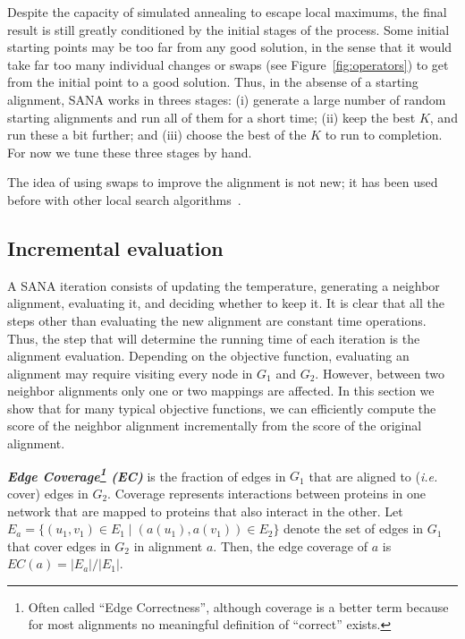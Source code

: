 \documentclass{bioinfo}
\begin{document}
\begin{methods}
Despite the capacity of simulated annealing to escape local maximums, the final result is still greatly conditioned by the initial stages of the process. Some initial starting points may be too far from any good solution, in the sense that it would take far too many individual changes or swaps (see Figure~\ref{fig:operators}) to get from the initial point to a good solution.
Thus, in the absense of a starting alignment, SANA works in threes stages: (i) generate a large number of random starting alignments and run all of them for a short time; (ii) keep the best $K$, and run these a bit further; and (iii) choose the best of the $K$ to run to completion.  For now we tune these three stages by hand.

The idea of using swaps to improve the alignment is not new; it has been used before with other local search algorithms~\citep{MAGNA,PISwap}.

\subsection{Incremental evaluation}\label{implementation}

A SANA iteration consists of updating the temperature, generating a neighbor alignment, evaluating it, and deciding whether to keep it. It is clear that all the steps other than evaluating the new alignment are constant time operations. Thus, the step that will determine the running time of each iteration is the alignment evaluation. Depending on the objective function, evaluating an alignment may require visiting every node in $G_1$ and $G_2$. However, between two neighbor alignments only one or two mappings are affected. In this section we show that for many typical objective functions, we can efficiently compute the score of the neighbor alignment incrementally from the score of the original alignment.

\emph{\textbf{Edge Coverage\footnote{Often called ``Edge Correctness'', although coverage is a better term because for most alignments no meaningful definition of ``correct'' exists.} (EC)}} is the fraction of edges in $G_1$ that are aligned to ({\it i.e.} cover) edges in $G_2$. Coverage represents interactions between proteins in one network that are mapped to proteins that also interact in the other. Let $E_a=\{(u_1,v_1)\in E_1\mid (a(u_1),a(v_1))\in E_2\}$ denote the set of edges in $G_1$ that cover edges in $G_2$ in alignment $a$. Then, the edge coverage of $a$ is $EC(a)={|E_a|}/{|E_1|}$. 


\end{methods}
\end{document}
